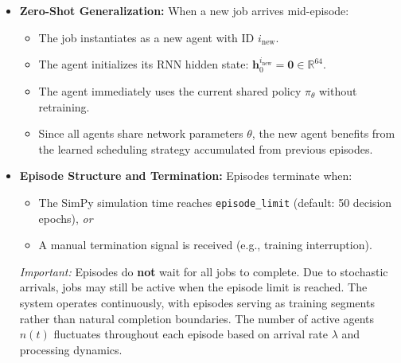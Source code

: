 \begin{itemize}
\begin{itemize}
    \item \textit{Practical equivalence to dynamic architectures:} When \(n_{\max}\) is configured sufficiently above the expected peak agent count (e.g., \(n_{\max} = 10\) for \(\lambda = 0.5\) jobs/time-unit with \(\text{episode\_limit} = 50\), yielding expected peak \(\approx 5\text{--}6\) agents), the fixed-capacity approach behaves equivalently to fully dynamic architectures—no job is rejected due to capacity constraints, and zero-padding introduces no computational overhead beyond unused matrix elements. This design choice reflects real-world manufacturing constraints where production systems operate within planned capacity limits: facilities periodically close and reopen job intake based on workload, naturally imposing bounded concurrency similar to \(n_{\max}\). Alternative architectures such as attention-based mixers \citep{wang2020qplex} or transformer-based aggregation could eliminate capacity constraints but sacrifice monotonicity guarantees (and thus IGM) while introducing additional architectural complexity and potential training instability—tradeoffs deemed unnecessary given the controlled arrival rates and capacity planning inherent to manufacturing scheduling contexts.
\end{itemize}

\item \textbf{Zero-Shot Generalization:} When a new job arrives mid-episode:
\begin{itemize}
    \item The job instantiates as a new agent with ID \(i_{\text{new}}\).
    \item The agent initializes its RNN hidden state: \(\mathbf{h}_0^{i_{\text{new}}} = \mathbf{0} \in \mathbb{R}^{64}\).
    \item The agent immediately uses the current shared policy \(\pi_\theta\) without retraining.
    \item Since all agents share network parameters \(\theta\), the new agent benefits from the learned scheduling strategy accumulated from previous episodes.
\end{itemize}

\item \textbf{Episode Structure and Termination:} Episodes terminate when:
\begin{itemize}
    \item The SimPy simulation time reaches \texttt{episode\_limit} (default: 50 decision epochs), \textit{or}
    \item A manual termination signal is received (e.g., training interruption).
\end{itemize}
\textit{Important:} Episodes do \textbf{not} wait for all jobs to complete. Due to stochastic arrivals, jobs may still be active when the episode limit is reached. The system operates continuously, with episodes serving as training segments rather than natural completion boundaries. The number of active agents \(n(t)\) fluctuates throughout each episode based on arrival rate \(\lambda\) and processing dynamics.


\end{itemize}
